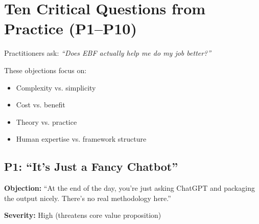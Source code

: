 \section{Ten Critical Questions from Practice (P1--P10)}
\label{sec:da-practice}

\begin{tcolorbox}[colback=blue!5!white, colframe=blue!75!black,
    title=Practitioner Objections: The Utility Challenge]

Practitioners ask: \textit{``Does EBF actually help me do my job better?''}

These objections focus on:
\begin{itemize}[nosep]
    \item Complexity vs. simplicity
    \item Cost vs. benefit
    \item Theory vs. practice
    \item Human expertise vs. framework structure
\end{itemize}

\end{tcolorbox}

\subsection{P1: ``It's Just a Fancy Chatbot''}
\label{sec:da-p1}

\begin{tcolorbox}[colback=gray!5!white, colframe=gray!75!black]
\textbf{Objection:} ``At the end of the day, you're just asking ChatGPT and
packaging the output nicely. There's no real methodology here.''

\textbf{Severity:} High (threatens core value proposition)
\end{tcolorbox}

